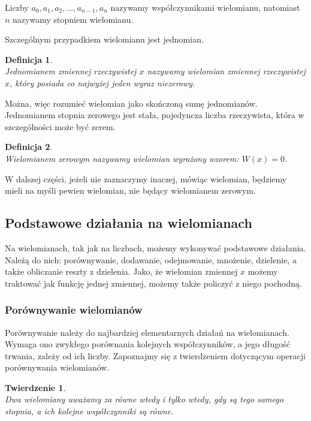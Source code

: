 \documentclass[oneside,a4paper]{book}
\newtheorem{theorem}{Twierdzenie}
\newtheorem{definition}{Definicja}
\begin{document}
	Liczby $a_0, a_1, a_2, ..., a_{n-1}, a_n$ nazywamy współczynnikami wielomianu, natomiast $n$ nazywamy stopniem wielomianu.
	
	Szczególnym przypadkiem wielomianu jest jednomian. 
	
	\begin{definition}
		$ $\\
		Jednomianem zmiennej rzeczywistej $x$ nazywamy wielomian zmiennej rzeczywistej $x$, który posiada co najwyżej jeden wyraz niezerowy.
	\end{definition}
	
	Można, więc rozumieć wielomian jako skończoną sumę jednomianów.
	Jednomianem stopnia zerowego jest stała, pojedyncza liczba rzeczywista, która w szczególności może być zerem.
	
	\begin{definition}
		$ $\\
		Wielomianem zerowym nazywamy wielomian wyrażony wzorem:	$W(x) = 0$.
	\end{definition}
	
	W dalszej części, jeżeli nie zaznaczymy inaczej, mówiąc wielomian, będziemy mieli na myśli pewien wielomian, nie będący wielomianem zerowym.
	
	\subsection{Podstawowe działania na wielomianach}
	
	Na wielomianach, tak jak na liczbach, możemy wykonywać podstawowe działania. Należą do nich: porównywanie, dodawanie, odejmowanie, mnożenie, dzielenie, a także obliczanie reszty z dzielenia. Jako, że wielomian zmiennej $x$ możemy traktować jak funkcję jednej zmiennej, możemy także policzyć z niego pochodną.
	
	\subsubsection{Porównywanie wielomianów}
	
	Porównywanie należy do najbardziej elementarnych działań na wielomianach. Wymaga ono zwykłego porównania kolejnych współczynników, a jego długość trwania, zależy od ich liczby. Zapoznajmy się z twierdzeniem dotyczącym operacji porównywania wielomianów.
	
	\begin{theorem}
		$ $\\
		Dwa wielomiany uważamy za równe wtedy i tylko wtedy, gdy są tego samego stopnia, a ich kolejne współczynniki są równe.
	\end{theorem}
	
\end{document}
